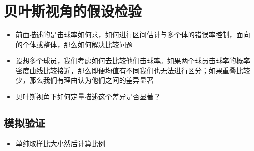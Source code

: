 \documentclass[
]{book}
\newenvironment{Shaded}{\begin{snugshade}}{\end{snugshade}}
\newcommand{\CommentTok}[1]{\textcolor[rgb]{0.56,0.35,0.01}{\textit{#1}}}
\newcommand{\FloatTok}[1]{\textcolor[rgb]{0.00,0.00,0.81}{#1}}
\newcommand{\KeywordTok}[1]{\textcolor[rgb]{0.13,0.29,0.53}{\textbf{#1}}}
\newcommand{\NormalTok}[1]{#1}
\newcommand{\OperatorTok}[1]{\textcolor[rgb]{0.81,0.36,0.00}{\textbf{#1}}}
\newcommand{\StringTok}[1]{\textcolor[rgb]{0.31,0.60,0.02}{#1}}
\providecommand{\tightlist}{%
  \setlength{\itemsep}{0pt}\setlength{\parskip}{0pt}}
\begin{document}
\hypertarget{ux8d1dux53f6ux65afux89c6ux89d2ux7684ux5047ux8bbeux68c0ux9a8c}{%
\section{贝叶斯视角的假设检验}\label{ux8d1dux53f6ux65afux89c6ux89d2ux7684ux5047ux8bbeux68c0ux9a8c}}

\begin{itemize}
\item
  前面描述的是击球率如何求，如何进行区间估计与多个体的错误率控制，面向的个体或整体，那么如何解决比较问题
\item
  设想多个球员，我们考虑如何去比较他们击球率。如果两个球员击球率的概率密度曲线比较接近，那么即便均值有不同我们也无法进行区分；如果重叠比较少，那么我们有理由认为他们之间的差异显著
\item
  贝叶斯视角下如何定量描述这个差异是否显著？
\end{itemize}

\hypertarget{ux6a21ux62dfux9a8cux8bc1}{%
\subsection{模拟验证}\label{ux6a21ux62dfux9a8cux8bc1}}

\begin{itemize}
\tightlist
\item
  单纯取样比大小然后计算比例
\end{itemize}

\begin{Shaded}
\end{Shaded}
\end{document}
